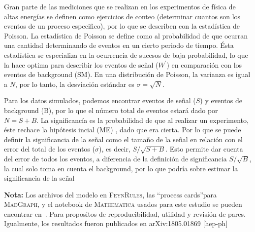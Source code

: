 Gran parte de las mediciones que se realizan en los experimentos de física de altas energías se definen como ejercicios de conteo (determinar cuantos son los eventos de un proceso especifico), por lo que se describen con la estadística de Poisson. La estadística de Poisson se define como al probabilidad de que ocurran una cantidad determinando de eventos en un cierto periodo de tiempo. Ésta estadística se especializa en la ocurrencia de sucesos de baja probabilidad, lo que la hace optima para describir los eventos de señal ($W^{\prime}$) en comparación con los eventos de background (SM). En una distribución de Poisson, la varianza es igual a $N$, por lo tanto, la desviación estándar es $\sigma = \sqrt{N}$.

Para los datos simulados, podemos encontrar eventos de señal ($S$) y eventos de background (B), por lo que el número total de eventos estará dado por $N = S + B$. La significancía es la probabilidad de que al realizar un experimento, éste rechace la hipótesis incial (ME) , dado que era cierta. Por lo que se puede definir la significancia de la señal como el tamaño de la señal en relación con el error del total de los eventos ($\sigma$), es decir, $S/\sqrt{S+B}$. Esto permite dar cuenta del error de todos los eventos, a diferencia de la definición  de significancia $S/ \sqrt{B}$, la cual solo toma en cuenta el background, por lo que podría sobre estimar la significancia de la señal~\cite{Punzi:2003bu}

\textbf{Nota:} Los archivos del modelo en \textsc{FeynRules}, las \textquotedblleft process cards\textquotedblright para \textsc{MadGraph}, y el notebook de \textsc{Mathematica} usados para este estudio se pueden encontrar en~\cite{mo_abdullah_2018_1240452}. Para propositos de reproducibilidad, utilidad y revisión de pares. Igualmente, los resultados fueron publicados en arXiv:1805.01869 [hep-ph]~\cite{Abdullah:2018ets}


